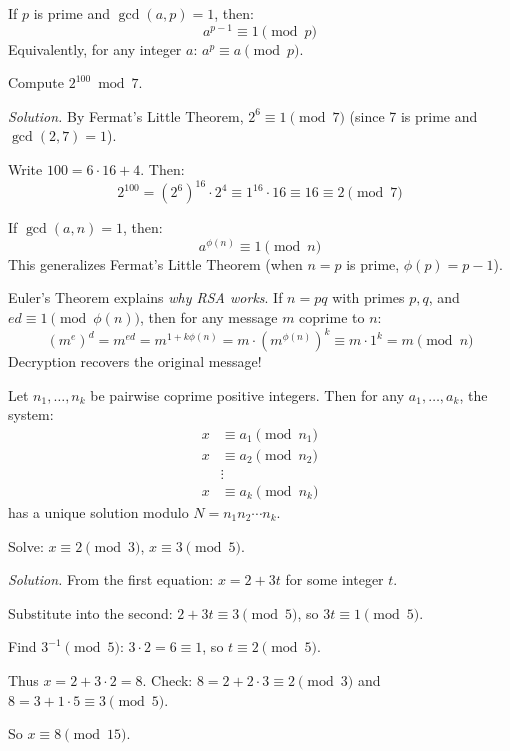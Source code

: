 \begin{theorem}
If $p$ is prime and $\gcd(a, p) = 1$, then:
\[
a^{p-1} \equiv 1 \pmod{p}
\]
Equivalently, for any integer $a$: $a^p \equiv a \pmod{p}$.
\end{theorem}

\begin{example}
Compute $2^{100} \bmod 7$.

\emph{Solution.} By Fermat's Little Theorem, $2^6 \equiv 1 \pmod{7}$ (since 7 is prime and $\gcd(2,7) = 1$).

Write $100 = 6 \cdot 16 + 4$. Then:
\[
2^{100} = (2^6)^{16} \cdot 2^4 \equiv 1^{16} \cdot 16 \equiv 16 \equiv 2 \pmod{7}
\]
\end{example}

\begin{theorem}
If $\gcd(a, n) = 1$, then:
\[
a^{\phi(n)} \equiv 1 \pmod{n}
\]
This generalizes Fermat's Little Theorem (when $n = p$ is prime, $\phi(p) = p-1$).
\end{theorem}

\begin{keyresult}
Euler's Theorem explains \emph{why RSA works}. If $n = pq$ with primes $p, q$, and $ed \equiv 1 \pmod{\phi(n)}$, then for any message $m$ coprime to $n$:
\[
(m^e)^d = m^{ed} = m^{1 + k\phi(n)} = m \cdot (m^{\phi(n)})^k \equiv m \cdot 1^k = m \pmod{n}
\]
Decryption recovers the original message!
\end{keyresult}

\begin{theorem}
Let $n_1, \ldots, n_k$ be pairwise coprime positive integers. Then for any $a_1, \ldots, a_k$, the system:
\begin{align*}
x &\equiv a_1 \pmod{n_1} \\
x &\equiv a_2 \pmod{n_2} \\
&\vdots \\
x &\equiv a_k \pmod{n_k}
\end{align*}
has a unique solution modulo $N = n_1 n_2 \cdots n_k$.
\end{theorem}

\begin{example}
Solve: $x \equiv 2 \pmod{3}$, $x \equiv 3 \pmod{5}$.

\emph{Solution.} From the first equation: $x = 2 + 3t$ for some integer $t$.

Substitute into the second: $2 + 3t \equiv 3 \pmod{5}$, so $3t \equiv 1 \pmod{5}$.

Find $3^{-1} \pmod{5}$: $3 \cdot 2 = 6 \equiv 1$, so $t \equiv 2 \pmod{5}$.

Thus $x = 2 + 3 \cdot 2 = 8$. Check: $8 = 2 + 2 \cdot 3 \equiv 2 \pmod{3}$ and $8 = 3 + 1 \cdot 5 \equiv 3 \pmod{5}$. \checkmark

So $x \equiv 8 \pmod{15}$.
\end{example}

